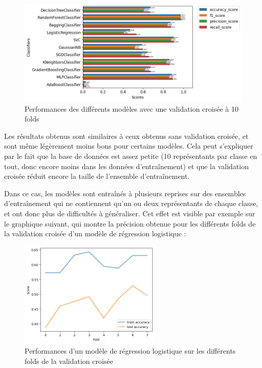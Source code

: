 \documentclass{article}
\begin{document}
\begin{figure}[h]
    \centering
    \includegraphics[width=1.2\textwidth]{img/all_perfs_with_cv.png}
    \caption{Performances des différents modèles avec une validation croisée à 10 folds}
\end{figure}

Les résultats obtenus sont similaires à ceux obtenus sans validation croisée, et sont
même légèrement moins bons pour certains modèles. Cela peut s'expliquer par le fait
que la base de données est assez petite (10 représentants par classe en tout, donc
encore moins dans les données d'entraînement) et que la validation croisée réduit encore
la taille de l'ensemble d'entraînement. 

Dans ce cas, les modèles sont entraînés à plusieurs reprises
sur des ensembles d'entraînement qui ne contiennent qu'un ou deux représentants de chaque classe,
et ont donc plus de difficultés à généraliser. Cet effet est visible par exemple sur le 
graphique suivant, qui montre la précision obtenue pour les différents folds de la validation
croisée d'un modèle de régression logistique :

\begin{figure}[h]
    \centering
    \includegraphics[width=0.6\textwidth]{img/folds_perfs_logreg.png}
    \caption{Performances d'un modèle de régression logistique sur les différents folds de la validation croisée}
\end{figure}
\newpage
\end{document}
